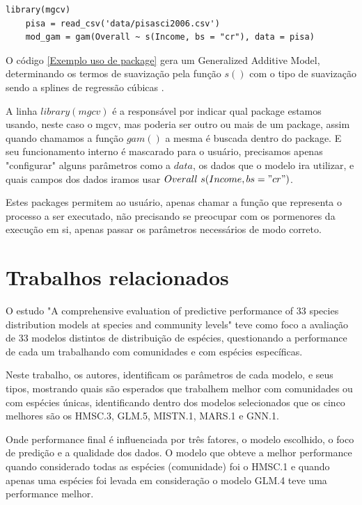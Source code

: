 \documentclass[
    12pt,               %
    openright,          %
    oneside,            %
    a4paper,            %
    english,            %
    brazil              %
    ]{abntex2}
\begin{document}
\lstset{style=r_code}
\begin{lstlisting}[caption={\label{Exemplo uso de package}Exemplo uso de package}]
    library(mgcv)
    pisa = read_csv('data/pisasci2006.csv')
    mod_gam = gam(Overall ~ s(Income, bs = "cr"), data = pisa)
\end{lstlisting}

O código \ref{Exemplo uso de package} gera um Generalized Additive Model, determinando os termos de suavização pela função $s()$ com o
tipo de suavização sendo a splines de regressão cúbicas \cite{gam_exemplo}. 

A linha $library(mgcv)$ é a responsável por indicar qual package estamos usando, neste caso o mgcv, mas poderia ser outro ou mais 
de um package, assim quando chamamos a função $gam()$ a mesma é buscada dentro do package. E seu funcionamento interno é mascarado 
para o usuário, precisamos apenas "configurar" alguns parâmetros como a $data$, os dados que o modelo ira utilizar, e quais campos 
dos dados iramos usar $Overall ~ s(Income, bs = "cr")$.  

Estes packages permitem ao usuário, apenas chamar a função que representa o processo a ser executado, não precisando se preocupar com
os pormenores da execução em si, apenas passar os parâmetros necessários de modo correto.

\section{Trabalhos relacionados}

O estudo "A comprehensive evaluation of predictive performance of 33 species distribution models at species and community levels"
\cite{predPerform33models} teve como foco a avaliação de 33 modelos distintos de distribuição de espécies, questionando a
performance de cada um trabalhando com comunidades e com espécies específicas.

Neste trabalho, os autores, identificam os parâmetros de cada modelo, e seus tipos, mostrando quais são esperados que trabalhem melhor
com comunidades ou com espécies únicas, identificando dentro dos modelos selecionados que os cinco melhores são os HMSC.3, GLM.5,
MISTN.1, MARS.1 e GNN.1.

Onde performance final é influenciada por três fatores, o modelo escolhido, o foco de predição e a qualidade dos dados. O modelo
que obteve a melhor performance quando considerado todas as espécies (comunidade) foi o HMSC.1 e quando apenas uma 
espécies foi levada em consideração o modelo GLM.4 teve uma performance melhor.
\end{document}
